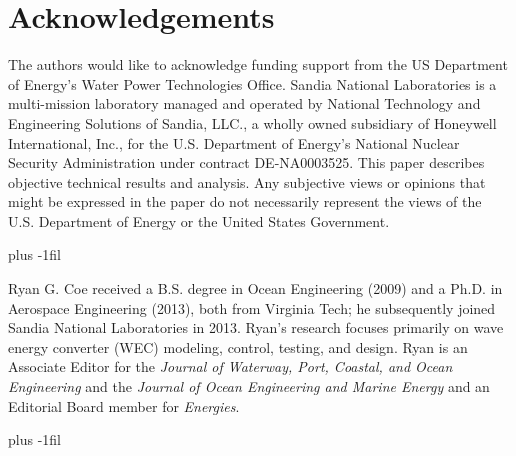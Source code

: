 \documentclass[lettersize,journal]{IEEEtran}
\begin{document}
\section{Acknowledgements}
The authors would like to acknowledge funding support from the US Department of Energy's Water Power Technologies Office.
Sandia National Laboratories is a multi-mission laboratory managed and operated by National Technology and Engineering Solutions of Sandia, LLC., a wholly owned subsidiary of Honeywell International, Inc., for the U.S. Department of Energy's National Nuclear Security Administration under contract DE-NA0003525.
This paper describes objective technical results and analysis.
Any subjective views or opinions that might be expressed in the paper do not necessarily represent the views of the U.S. Department of Energy or the United States Government.





\vskip 0pt plus -1fil


\begin{IEEEbiography}{Ryan G. Coe}
received a B.S. degree in Ocean Engineering (2009) and a Ph.D. in Aerospace Engineering (2013), both from Virginia Tech; he subsequently joined Sandia National Laboratories in 2013.
Ryan's research focuses primarily on wave energy converter (WEC) modeling, control, testing, and design.
Ryan is an Associate Editor for the \emph{Journal of Waterway, Port, Coastal, and Ocean Engineering} and the \emph{Journal of Ocean Engineering and Marine Energy} and an Editorial Board member for \emph{Energies}.
\end{IEEEbiography}

\vskip 0pt plus -1fil
\end{document}
